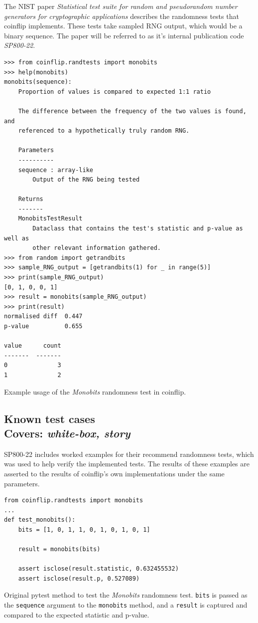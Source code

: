 \documentclass[11pt]{article}
\begin{document}
The NIST paper \textit{Statistical test suite for random and pseudorandom number generators for cryptographic applications} \cite{nist} describes the randomness tests that coinflip implements. These tests take sampled RNG output, which would be a binary sequence. The paper will be referred to as it's internal publication code \emph{SP800-22}.

\begin{listing}
\begin{verbatim}
>>> from coinflip.randtests import monobits
>>> help(monobits)
monobits(sequence):
    Proportion of values is compared to expected 1:1 ratio

    The difference between the frequency of the two values is found, and
    referenced to a hypothetically truly random RNG.

    Parameters
    ----------
    sequence : array-like
        Output of the RNG being tested

    Returns
    -------
    MonobitsTestResult
        Dataclass that contains the test's statistic and p-value as well as
        other relevant information gathered.
>>> from random import getrandbits
>>> sample_RNG_output = [getrandbits(1) for _ in range(5)]
>>> print(sample_RNG_output)
[0, 1, 0, 0, 1]
>>> result = monobits(sample_RNG_output)
>>> print(result)
normalised diff  0.447
p-value          0.655

value      count
-------  -------
0              3
1              2
\end{verbatim}
\caption{Example usage of the \textit{Monobits} randomness test in coinflip.}
\end{listing}

\subsection[Known test cases]{Known test cases\\ \small{Covers: \emph{white-box, story}}}
\label{sec:examples}

SP800-22 includes worked examples for their recommend randomness tests, which was used to help verify the implemented tests. The results of these examples are asserted to the results of coinflip's own implementations under the same parameters.


\begin{listing}[htbp]
\begin{verbatim}
from coinflip.randtests import monobits
...
def test_monobits():
    bits = [1, 0, 1, 1, 0, 1, 0, 1, 0, 1]

    result = monobits(bits)

    assert isclose(result.statistic, 0.632455532)
    assert isclose(result.p, 0.527089)
\end{verbatim}
\caption{\label{code:test_monobits}Original pytest method to test the \emph{Monobits} randomness test. \texttt{bits} is passed as the \texttt{sequence} argument to the \texttt{monobits} method, and a \texttt{result} is captured and compared to the expected statistic and p-value.}
\end{listing}
\end{document}
